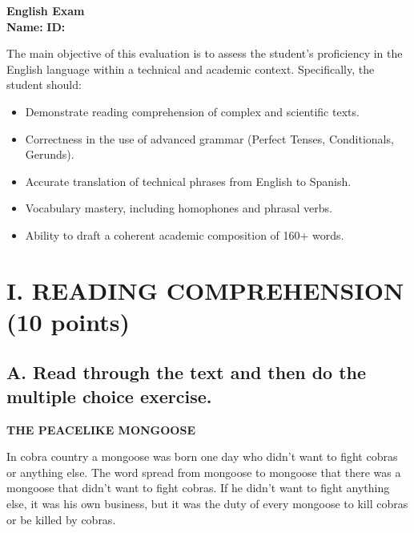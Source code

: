 \documentclass[11pt,a4paper]{article}
\begin{document}
\begin{center}
    {\huge \textbf{English Exam}} \\
    \vspace{0.5cm}
    \textbf{Name:} \underline{\hspace{8cm}} \quad \textbf{ID:} \underline{\hspace{4cm}}
\end{center}

\vspace{0.3cm}

\begin{tcolorbox}[colback=gray!5,colframe=gray!50,title=Course Objectives \& Evaluation Goals]
    The main objective of this evaluation is to assess the student's proficiency in the English language within a technical and academic context. Specifically, the student should:
    \begin{itemize}[noitemsep]
        \item Demonstrate reading comprehension of complex and scientific texts.
        \item Correctness in the use of advanced grammar (Perfect Tenses, Conditionals, Gerunds).
        \item Accurate translation of technical phrases from English to Spanish.
        \item Vocabulary mastery, including homophones and phrasal verbs.
        \item Ability to draft a coherent academic composition of 160+ words.
    \end{itemize}
\end{tcolorbox}

\vspace{0.5cm}

\section{I. READING COMPREHENSION (10 points)}

\subsection{A. Read through the text and then do the multiple choice exercise.}

\begin{center}
    \textbf{THE PEACELIKE MONGOOSE}
\end{center}

In cobra country a mongoose was born one day who didn't want to fight cobras or anything else. The word spread from mongoose to mongoose that there was a mongoose that didn't want to fight cobras. If he didn't want to fight anything else, it was his own business, but it was the duty of every mongoose to kill cobras or be killed by cobras.
\end{document}
